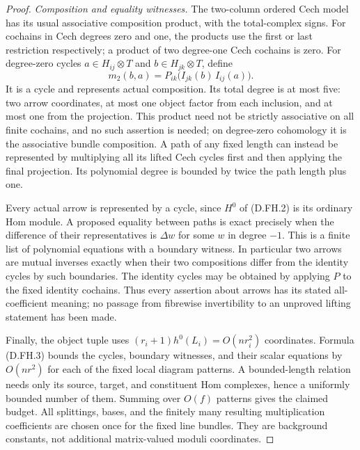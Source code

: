 \begin{proof}
\emph{Composition and equality witnesses.}
The two-column ordered Cech model has its usual associative
composition product, with the total-complex signs. For
cochains in Cech degrees zero and one, the products use
the first or last restriction respectively; a product of
two degree-one Cech cochains is zero. For degree-zero
cycles $a\in H_{ij}\otimes T$ and
$b\in H_{jk}\otimes T$, define
\[
             m_2(b,a)=P_{ik}\bigl(I_{jk}(b)\,I_{ij}(a)\bigr).
                                                        \tag{D.FH.10}
\]
It is a cycle and represents actual composition. Its total
degree is at most five: two arrow coordinates, at most one
object factor from each inclusion, and at most one from the
projection. This product need not be strictly associative
on all finite cochains, and no such assertion is needed;
on degree-zero cohomology it is the associative bundle
composition. A path of any fixed length can instead be
represented by multiplying all its lifted Cech cycles first
and then applying the final projection. Its polynomial
degree is bounded by twice the path length plus one.

Every actual arrow is represented by a cycle, since
$H^0$ of (D.FH.2) is its ordinary Hom module. A proposed
equality between paths is exact precisely when the
difference of their representatives is $\Delta w$ for
some $w$ in degree $-1$. This is a finite list of polynomial
equations with a boundary witness. In particular two arrows
are mutual inverses exactly when their two compositions
differ from the identity cycles by such boundaries.
The identity cycles may be obtained by applying $P$ to the
fixed identity cochains. Thus every assertion about arrows
has its stated all-coefficient meaning; no passage from
fibrewise invertibility to an unproved lifting statement
has been made.

Finally, the object tuple uses
$(r_i+1)h^0(L_i)=O(nr_i^2)$ coordinates. Formula (D.FH.3)
bounds the cycles, boundary witnesses, and their scalar
equations by $O(nr^2)$ for each of the fixed local diagram
patterns. A bounded-length relation needs only its source,
target, and constituent Hom complexes, hence a uniformly
bounded number of them. Summing over $O(f)$ patterns gives
the claimed budget. All splittings, bases, and the finitely
many resulting multiplication coefficients are chosen once
for the fixed line bundles. They are background constants,
not additional matrix-valued moduli coordinates.
\end{proof}

